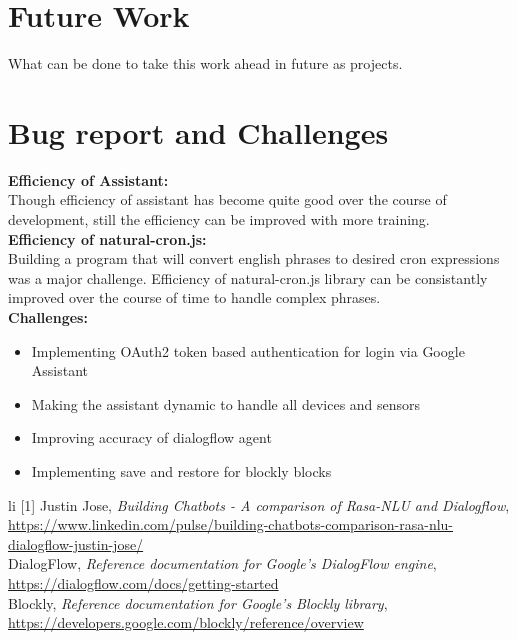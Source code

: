 \documentclass[a4paper,12pt,oneside]{book}
\begin{document}
\section{Future Work}
What can be done to take this work ahead in future as projects.

\section{Bug report and Challenges}
\textbf{Efficiency of Assistant:}
\\Though efficiency of assistant has become quite good over the course of development, still the efficiency can be improved with more training.
\\\newline\textbf{Efficiency of natural-cron.js:}
\\Building a program that will convert english phrases to desired cron expressions was a major challenge. Efficiency of natural-cron.js library can be consistantly improved over the course of time to handle complex phrases.
\\\newline\textbf{Challenges:}
\begin{itemize}
\item Implementing OAuth2 token based authentication for login via Google Assistant
\item Making the assistant dynamic to handle all devices and sensors
\item Improving accuracy of dialogflow agent
\item Implementing save and restore for blockly blocks
\end{itemize}

\begin{thebibliography}{li}
[1] Justin Jose,
{\em Building Chatbots - A comparison of Rasa-NLU and Dialogflow},
\href{https://www.linkedin.com/pulse/building-chatbots-comparison-rasa-nlu-dialogflow-justin-jose/}{https://www.linkedin.com/pulse/building-chatbots-comparison-rasa-nlu-dialogflow-justin-jose/}
\\\newline
[2] DialogFlow,
{\em Reference documentation for Google's DialogFlow engine},
\href{https://dialogflow.com/docs/getting-started}{https://dialogflow.com/docs/getting-started}
\\\newline
[3] Blockly,
{\em Reference documentation for Google's Blockly library},
\href{https://developers.google.com/blockly/reference/overview}{https://developers.google.com/blockly/reference/overview}
\end{thebibliography}
\end{document}

